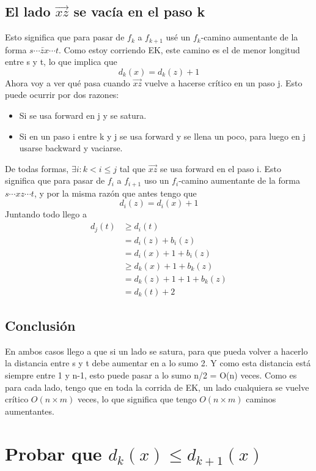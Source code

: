 \documentclass[11pt]{article}
\begin{document}
\subsection{El lado \(\overrightarrow{xz}\) se vacía en el paso k}
\label{sec:org9512736}
Esto significa que para pasar de \(f_k\) a \(f_{k+1}\) usé un \(f_k\)-camino aumentante de la forma \(s \cdots \overleftarrow{zx} \cdots t\). Como estoy corriendo EK, este camino es el de menor longitud entre s y t, lo que implica que 
\[ d_k(x) = d_k(z) + 1 \]
Ahora voy a ver qué pasa cuando \(\overrightarrow{xz}\) vuelve a hacerse crítico en un paso j. Esto puede ocurrir por dos razones:
\begin{itemize}
\item Si se usa forward en j y se satura.
\item Si en un paso i entre k y j se usa forward y se llena un poco, para luego en j usarse backward y vaciarse.
\end{itemize}
De todas formas, \(\exists i : k < i \le j\) tal que \(\overrightarrow{xz}\) se usa forward en el paso i. Esto significa que para pasar de \(f_i\) a \(f_{i+1}\) uso un \(f_i\)-camino aumentante de la forma \({s \cdots x z \cdots t}\), y por la misma razón que antes tengo que
\[d_i(z) = d_i(x) + 1\]
Juntando todo llego a
\begin{align*}
d_j(t) & \ge d_i(t) \\
       & = d_i(z) + b_i(z) \\
       & = d_i(x) + 1 + b_i(z) \\
       & \ge d_k(x) + 1 + b_k(z) \\
       & = d_k(z) + 1 + 1 + b_k(z) \\
       & = d_k(t) + 2
\end{align*}
\subsection{Conclusión}
\label{sec:org829688c}
En ambos casos llego a que si un lado se satura, para que pueda volver a hacerlo la distancia entre s y t debe aumentar en a lo sumo 2. Y como esta distancia está siempre entre 1 y n-1, esto puede pasar a lo sumo n/2 = O(n) veces. Como es para cada lado, tengo que en toda la corrida de EK, un lado cualquiera se vuelve crítico \(O(n \times m)\) veces, lo que significa que tengo \(O(n \times m)\) caminos aumentantes.


\section{Probar que \({d_k(x) \le d_{k+1}(x)}\)}
\label{sec:orga5328ee}
\end{document}
